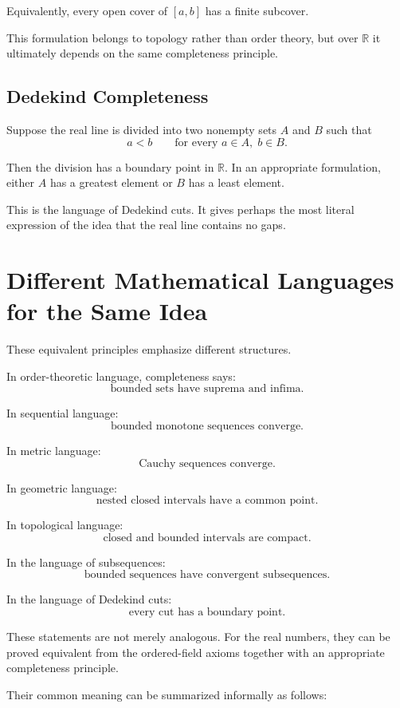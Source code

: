 \documentclass{essay}
\begin{document}
Equivalently, every open cover of \([a,b]\) has a finite subcover.

This formulation belongs to topology rather than order theory, but over \(\mathbb{R}\) it ultimately depends on the same completeness principle.

\subsection{Dedekind Completeness}

Suppose the real line is divided into two nonempty sets \(A\) and \(B\) such that
\[
a<b
\qquad
\text{for every } a\in A,\; b\in B.
\]

Then the division has a boundary point in \(\mathbb{R}\). In an appropriate formulation, either \(A\) has a greatest element or \(B\) has a least element.

This is the language of Dedekind cuts. It gives perhaps the most literal expression of the idea that the real line contains no gaps.

\section{Different Mathematical Languages for the Same Idea}

These equivalent principles emphasize different structures.

In order-theoretic language, completeness says:
\[
\text{bounded sets have suprema and infima}.
\]

In sequential language:
\[
\text{bounded monotone sequences converge}.
\]

In metric language:
\[
\text{Cauchy sequences converge}.
\]

In geometric language:
\[
\text{nested closed intervals have a common point}.
\]

In topological language:
\[
\text{closed and bounded intervals are compact}.
\]

In the language of subsequences:
\[
\text{bounded sequences have convergent subsequences}.
\]

In the language of Dedekind cuts:
\[
\text{every cut has a boundary point}.
\]

These statements are not merely analogous. For the real numbers, they can be proved equivalent from the ordered-field axioms together with an appropriate completeness principle.

Their common meaning can be summarized informally as follows:
\end{document}
